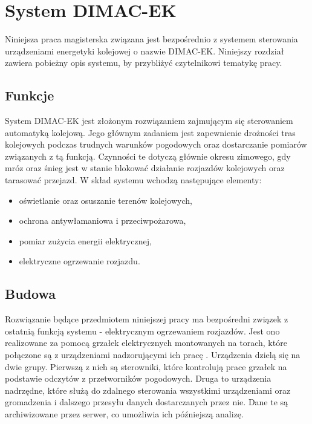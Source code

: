 \chapter{System DIMAC-EK}

Niniejsza praca magisterska związana jest bezpośrednio z systemem sterowania urządzeniami energetyki kolejowej o nazwie DIMAC-EK. Niniejszy rozdział zawiera pobieżny opis systemu, by przybliżyć czytelnikowi tematykę pracy.

\section{Funkcje}

System DIMAC-EK jest złożonym rozwiązaniem zajmującym się sterowaniem automatyką kolejową\cite{dimacek-katalog}. Jego głównym zadaniem jest zapewnienie drożności tras kolejowych podczas trudnych warunków pogodowych oraz dostarczanie pomiarów związanych z tą funkcją. Czynności te dotyczą głównie okresu zimowego, gdy mróz oraz śnieg jest w stanie blokować działanie rozjazdów kolejowych oraz tarasować przejazd. W skład systemu wchodzą następujące elementy:

\begin{itemize}
\item oświetlanie oraz osuszanie terenów kolejowych,
\item ochrona antywłamaniowa i przeciwpożarowa,
\item pomiar zużycia energii elektrycznej,
\item elektryczne ogrzewanie rozjazdu.
\end{itemize}

\section{Budowa}
Rozwiązanie będące przedmiotem niniejszej pracy ma bezpośredni związek z ostatnią funkcją systemu - elektrycznym ogrzewaniem rozjazdów. Jest ono realizowane za pomocą grzałek elektrycznych montowanych na torach, które połączone są z urządzeniami nadzorującymi ich pracę \cite{dimacek-wytyczne}. Urządzenia dzielą się na dwie grupy. Pierwszą z nich są sterowniki, które kontrolują  prace grzałek na podstawie odczytów z przetworników pogodowych. Druga to urządzenia nadrzędne, które służą do zdalnego sterowania wszystkimi urządzeniami oraz gromadzenia i dalszego przesyłu danych dostarczanych przez nie. Dane te są archiwizowane przez serwer, co umożliwia ich późniejszą analizę.

